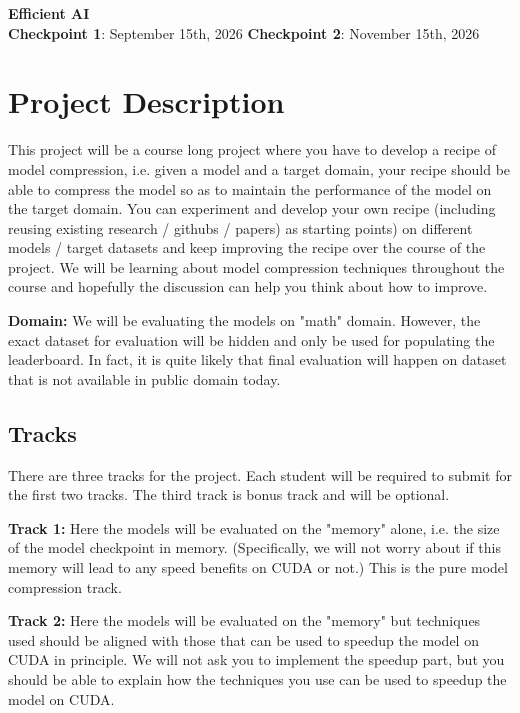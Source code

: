 \documentclass[11pt]{article}
\newcommand{\coursetitle}{Efficient AI}
\begin{document}
\begin{center}
    {\Large\bfseries \coursetitle}\\[0.3em]
    \textbf{Checkpoint 1}: September 15th, 2026 \quad\quad \textbf{Checkpoint 2}: November 15th, 2026
\end{center}

\bigskip
\noindent
\section{Project Description}
This project will be a course long project where you have to develop a recipe of model compression, i.e. given a model and a target domain, your recipe should be able to compress the model so as to maintain the performance of the model on the target domain. You can experiment and develop your own recipe (including reusing existing research / githubs / papers) as starting points) on different models / target datasets and keep improving the recipe over the course of the project. We will be learning about model compression techniques throughout the course and hopefully the discussion can help you think about how to improve. 

\textbf{Domain:} We will be evaluating the models on "math" domain. However, the exact dataset for evaluation will be hidden and only be used for populating the leaderboard.
In fact, it is quite likely that final evaluation will happen on dataset that is not available in public domain today.

\subsection{Tracks}
There are three tracks for the project. Each student will be required to submit for the first two tracks. The third track is bonus track and will be optional. 

\textbf{Track 1:} Here the models will be evaluated on the "memory" alone, i.e. the size of the model checkpoint in memory. (Specifically, we will not worry about if this memory will lead to any speed benefits on CUDA or not.) This is the pure model compression track.

\textbf{Track 2:} Here the models will be evaluated on the "memory" but techniques used should be aligned with those that can be used to speedup the model on CUDA in principle. We will not ask you to implement the speedup part, but you should be able to explain how the techniques you use can be used to speedup the model on CUDA. 
\end{document}

